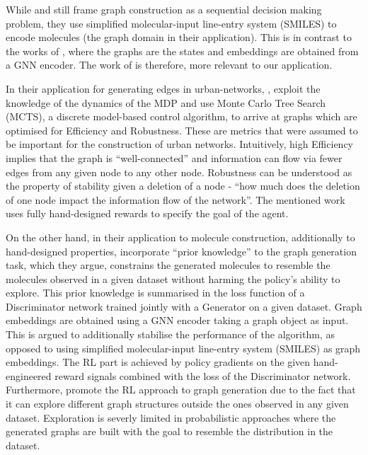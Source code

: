 \documentclass{report}
\numberwithin{equation}{section}
\numberwithin{figure}{section}
\numberwithin{table}{section}
\numberwithin{algorithm}{section}
\begin{document}
While \cite{Yang2017} and \cite{olivecrona2017molecular} 
still frame graph construction as a 
sequential decision making problem, 
they use simplified molecular-input line-entry system (SMILES) to 
encode molecules (the graph domain in their application). 
This is in contrast to the works of \citet{GCNPolicyGraphGen,GraphOpt},
where the graphs are the states and embeddings are obtained 
from a GNN 
encoder. The work of \citet{GCNPolicyGraphGen,GraphOpt} 
is therefore, more relevant to our application. 

In their application for generating edges in urban-networks, 
\cite{Darvariu}, exploit the knowledge of the dynamics of 
the MDP and use Monte Carlo Tree Search (MCTS), a discrete 
model-based control algorithm, to arrive at 
graphs which are optimised for 
Efficiency and Robustness. These are metrics that were assumed 
to be important for the construction of urban networks. Intuitively, 
high Efficiency implies that the graph is ``well-connected'' and 
information can flow via fewer edges from any given node to any 
other node. Robustness can be understood as the property of 
stability given a deletion of a node - ``how 
much does the deletion of one node impact the information flow 
of the network''. The mentioned work uses fully hand-designed 
rewards to specify the goal of the agent.

On the other hand, in their application to 
molecule construction, 
additionally to hand-designed properties, \cite{GCNPolicyGraphGen}
incorporate ``prior knowledge'' to the graph generation task, which 
they argue, constrains the generated molecules to resemble the 
molecules observed in a given dataset without harming the 
policy's ability to explore. This prior knowledge is 
summarised in the loss function of a Discriminator network trained 
jointly with a Generator on a given dataset. Graph embeddings 
are obtained using a GNN encoder taking a graph 
object as input. This is argued to additionally stabilise the 
performance of the algorithm, as opposed to using 
simplified molecular-input line-entry system (SMILES) as 
graph embeddings.
 The RL part is achieved by policy gradients 
on the given hand-engineered 
reward signals combined with the loss of the Discriminator 
network. Furthermore, \cite{GCNPolicyGraphGen} promote the RL 
approach to graph generation due to the fact that it can explore 
different graph structures outside the ones observed in any 
given dataset. Exploration is severly limited in probabilistic 
approaches where the generated graphs are built with the goal 
to resemble the distribution in the dataset.
\end{document}
